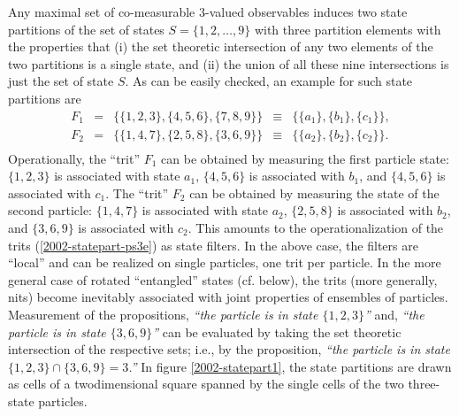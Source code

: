 Any maximal set of
co-measurable $3$-valued observables induces two state partitions
of the set of states $S=\{1,2,\ldots , 9\}$ with three partition
elements with the properties
that (i) the set theoretic intersection of any two elements of the two
partitions is a single state, and (ii) the union of all these nine
intersections is just the set of state $S$.
As can be easily checked, an example for such state partitions are
\begin{equation}
\begin{array}{llllll}
F_1&=&\{\{1,2,3\},\{4,5,6\},\{7,8,9\}\}&\equiv& \{\{a_1\},\{b_1\},\{c_1\}\},\\
F_2&=&\{\{1,4,7\},\{2,5,8\},\{3,6,9\}\}&\equiv& \{\{a_2\},\{b_2\},\{c_2\}\}.\\
\end{array}
\label{2002-statepart-ps3e}
\end{equation}
Operationally, the ``trit'' $F_1$ can be obtained by
measuring the first particle state:
$\{1,2,3\}$ is associated with state $a_1$,
$\{4,5,6\}$ is associated with $b_1$,  and
$\{4,5,6\}$ is associated with $c_1$.
The ``trit'' $F_2$ can be obtained by
measuring the state of the second particle:
$\{1,4,7\}$ is associated with state $a_2$,
$\{2,5,8\}$ is associated with $b_2$,  and
$\{3,6,9\}$ is associated with $c_2$.
This amounts to the operationalization of the trits (\ref{2002-statepart-ps3e})
as state filters.
In the above case, the filters are ``local'' and can be realized on single particles,
one trit per particle.
In the more general case of rotated ``entangled'' states (cf. below),
the trits (more generally, nits) become
inevitably associated with joint properties of ensembles of particles.
Measurement of the propositions,
{\em ``the particle is in state $\{1,2,3\}$''}
and,
{\em ``the particle is in state $\{3,6,9\}$''}
can be evaluated by taking the set theoretic intersection of the respective sets; i.e., by
the proposition,
{\em ``the particle is in state $\{1,2,3\}\cap \{3,6,9\} = 3$.''}
In figure \ref{2002-statepart1},
the state partitions are drawn as cells of a twodimensional square spanned
by the single cells of the two three-state particles.
